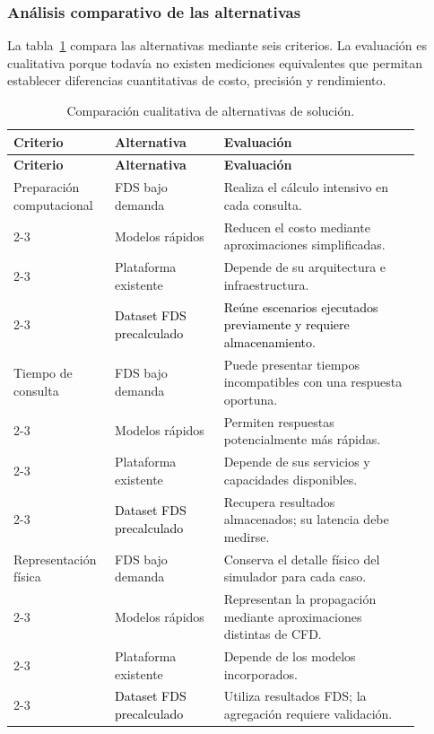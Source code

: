 \subsubsection{Análisis comparativo de las alternativas}
\label{sec:comparacion-alternativas}

La tabla~\ref{tab:comparacion-alternativas} compara las alternativas mediante seis criterios. La evaluación es cualitativa porque todavía no existen mediciones equivalentes que permitan establecer diferencias cuantitativas de costo, precisión y rendimiento.

\begingroup
\small
\renewcommand{\arraystretch}{1.1}

\begin{longtable}{@{}p{0.20\linewidth}p{0.25\linewidth}p{0.45\linewidth}@{}}
\caption{Comparación cualitativa de alternativas de solución.}
\label{tab:comparacion-alternativas}\\
\hline
\textbf{Criterio} &
\textbf{Alternativa} &
\textbf{Evaluación} \\
\hline
\endfirsthead

\hline
\textbf{Criterio} &
\textbf{Alternativa} &
\textbf{Evaluación} \\
\hline
\endhead

Preparación computacional &
FDS bajo demanda &
Realiza el cálculo intensivo en cada consulta. \\
\cline{2-3}
&
Modelos rápidos &
Reducen el costo mediante aproximaciones simplificadas. \\
\cline{2-3}
&
Plataforma existente &
Depende de su arquitectura e infraestructura. \\
\cline{2-3}
&
\textcolor{black}{Dataset FDS precalculado} &\textcolor{black}{Reúne escenarios ejecutados previamente y requiere almacenamiento.} \\
\hline

Tiempo de consulta &
FDS bajo demanda &
Puede presentar tiempos incompatibles con una respuesta oportuna. \\
\cline{2-3}
&
Modelos rápidos &
Permiten respuestas potencialmente más rápidas. \\
\cline{2-3}
&
Plataforma existente &
Depende de sus servicios y capacidades disponibles. \\
\cline{2-3}
&
\textcolor{black}{Dataset FDS precalculado} &
Recupera resultados almacenados; su latencia debe medirse. \\
\hline

Representación física &
FDS bajo demanda &
Conserva el detalle físico del simulador para cada caso. \\
\cline{2-3}
&
Modelos rápidos &
Representan la propagación mediante aproximaciones distintas de CFD. \\
\cline{2-3}
&
Plataforma existente &
Depende de los modelos incorporados. \\
\cline{2-3}
&
\textcolor{black}{Dataset FDS precalculado} &
Utiliza resultados FDS; la agregación requiere validación. \\
\hline


\end{longtable}
